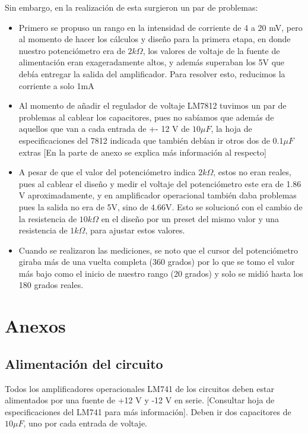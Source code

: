 \documentclass[12pt]{article}
\begin{document}
		Sin embargo, en la realización de esta surgieron un par de problemas:
		\begin{itemize}
		    \item Primero se propuso un rango en la intensidad de corriente de 4 a 20 mV, pero al momento de hacer los cálculos y diseño para la primera etapa, en donde nuestro potenciómetro era de $2k\Omega$, los valores de voltaje de la fuente de alimentación eran exageradamente altos, y además superaban los 5V que debía entregar la salida del amplificador. Para resolver esto, reducimos la corriente a solo 1mA
		    \item Al momento de añadir el regulador de voltaje LM7812 tuvimos un par de problemas al cablear los capacitores, pues no sabíamos que además de aquellos que van a cada entrada de +- 12 V de $10\mu F$, la hoja de especificaciones del 7812 indicada que también debían ir otros dos de $0.1\mu F$ extras [En la parte de anexo se explica más información al respecto]
		    \item A pesar de que el valor del potenciómetro indica $2k\Omega$, estos no eran reales, pues al cablear el diseño y medir el voltaje del potenciómetro este era de 1.86 V aproximadamente, y en amplificador operacional también daba problemas pues la salida no era de 5V, sino de 4.66V. Esto se solucionó con el cambio de la resistencia de $10k\Omega$ en el diseño por un preset del mismo valor y una resistencia de $1k\Omega$, para ajustar estos valores.
		    \item Cuando se realizaron las mediciones, se noto que el cursor del potenciómetro giraba más de una vuelta completa (360 grados) por lo que se tomo el valor más bajo como el inicio de nuestro rango (20 grados) y solo se midió hasta los 180 grados reales.
		\end{itemize}
		\newpage
	
	\section{Anexos}
	    \subsection{Alimentación del circuito}
	        Todos los amplificadores operacionales LM741 de los circuitos deben estar alimentados por una fuente de +12 V y -12 V en serie. [Consultar hoja de especificaciones del LM741 para más información]. Deben ir dos capacitores de $10\mu F$, uno por cada entrada de voltaje.
	        
\end{document}
